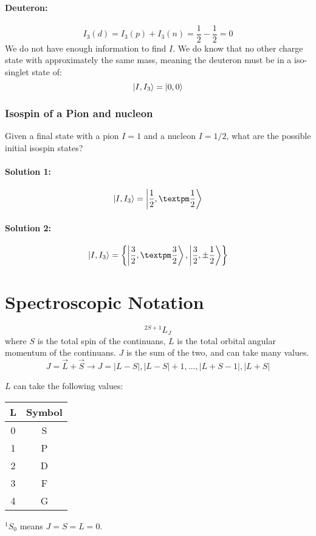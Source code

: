 \paragraph{Deuteron:}
\begin{equation}
  I_3(d) = I_3(p) + I_3(n) = \frac{1}{2} - \frac{1}{2} = 0
\end{equation}
We do not have enough information to find $I$. We do know that no other charge state with approximately the same mass, meaning the deuteron must be in a iso-singlet state of:
\begin{equation}
  \ket{I, I_3} = \ket{0, 0}
\end{equation}

\subsubsection{Isospin of a Pion and nucleon}
Given a final state with a pion $I = 1$ and a nucleon $I = 1 / 2$, what are the possible initial isospin states?

\paragraph{Solution 1:}
\begin{equation}
  \ket{I, I_3}  = \ket{\frac{1}{2}, ±\frac{1}{2}}
\end{equation}

\paragraph{Solution 2:}
\begin{equation}
\ket{I, I_3}  = \left\{\ket{\frac{3}{2}, ±\frac{3}{2}} , \ket{\frac{3}{2}, \pm \frac{1}{2}}\right\}
\end{equation}

\section{Spectroscopic Notation}
\begin{equation}
^{2S + 1}L_{J}
\end{equation}
where $S$ is the total spin of the continuans, $L$ is the total orbital angular momentum of the continuans. $J$ is the sum of the two, and can take many values. 
\begin{equation}    
  J = \vec{L} + \vec{S} → J = \left|L - S\right|, \left|L - S\right| + 1, \ldots  , \left|L + S - 1\right|,  \left|L + S\right|
\end{equation}

$L$ can take the following values:
\begin{table}[h!]
\begin{tabular}{ |c|c| }
\hline
L &Symbol \\ 
\hline
0 &S \\ 
1 &P \\ 
2 &D \\ 
3 &F \\ 
4 &G \\ 
\hline
\end{tabular}
\end{table}
$^{1}S_0$ means $J = S = L = 0$. 

